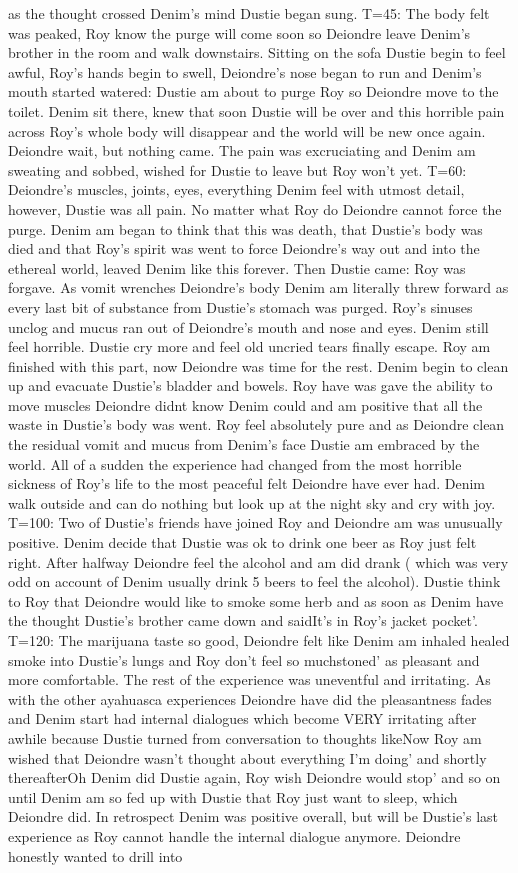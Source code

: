 \documentclass[12pt]{book}
\begin{document}
as the thought crossed Denim's mind Dustie began sung. T=45: The body felt was peaked, Roy know the purge will come soon so Deiondre leave Denim's brother in the room and walk downstairs. Sitting on the sofa Dustie begin to feel awful, Roy's hands begin to swell, Deiondre's nose began to run and Denim's mouth started watered: Dustie am about to purge Roy so Deiondre move to the toilet. Denim sit there, knew that soon Dustie will be over and this horrible pain across Roy's whole body will disappear and the world will be new once again. Deiondre wait, but nothing came. The pain was excruciating and Denim am sweating and sobbed, wished for Dustie to leave but Roy won't yet. T=60: Deiondre's muscles, joints, eyes, everything Denim feel with utmost detail, however, Dustie was all pain. No matter what Roy do Deiondre cannot force the purge. Denim am began to think that this was death, that Dustie's body was died and that Roy's spirit was went to force Deiondre's way out and into the ethereal world, leaved Denim like this forever. Then Dustie came: Roy was forgave. As vomit wrenches Deiondre's body Denim am literally threw forward as every last bit of substance from Dustie's stomach was purged. Roy's sinuses unclog and mucus ran out of Deiondre's mouth and nose and eyes. Denim still feel horrible. Dustie cry more and feel old uncried tears finally escape. Roy am finished with this part, now Deiondre was time for the rest. Denim begin to clean up and evacuate Dustie's bladder and bowels. Roy have was gave the ability to move muscles Deiondre didnt know Denim could and am positive that all the waste in Dustie's body was went. Roy feel absolutely pure and as Deiondre clean the residual vomit and mucus from Denim's face Dustie am embraced by the world. All of a sudden the experience had changed from the most horrible sickness of Roy's life to the most peaceful felt Deiondre have ever had. Denim walk outside and can do nothing but look up at the night sky and cry with joy. T=100: Two of Dustie's friends have joined Roy and Deiondre am was unusually positive. Denim decide that Dustie was ok to drink one beer as Roy just felt right. After halfway Deiondre feel the alcohol and am did drank ( which was very odd on account of Denim usually drink 5 beers to feel the alcohol). Dustie think to Roy that Deiondre would like to smoke some herb and as soon as Denim have the thought Dustie's brother came down and saidIt's in Roy's jacket pocket'. T=120: The marijuana taste so good, Deiondre felt like Denim am inhaled healed smoke into Dustie's lungs and Roy don't feel so muchstoned' as pleasant and more comfortable. The rest of the experience was uneventful and irritating. As with the other ayahuasca experiences Deiondre have did the pleasantness fades and Denim start had internal dialogues which become VERY irritating after awhile because Dustie turned from conversation to thoughts likeNow Roy am wished that Deiondre wasn't thought about everything I'm doing' and shortly thereafterOh Denim did Dustie again, Roy wish Deiondre would stop' and so on until Denim am so fed up with Dustie that Roy just want to sleep, which Deiondre did. In retrospect Denim was positive overall, but will be Dustie's last experience as Roy cannot handle the internal dialogue anymore. Deiondre honestly wanted to drill into 
\end{document}
